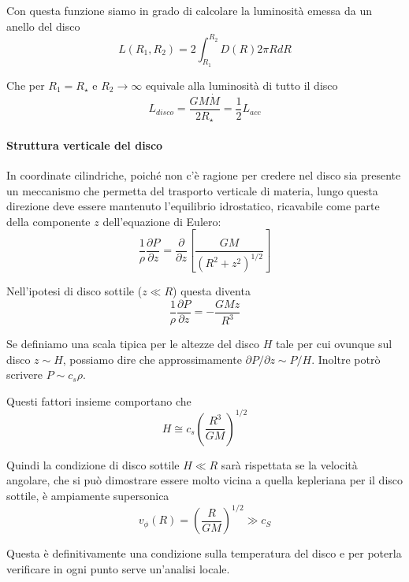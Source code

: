 \documentclass[a4paperbi]{article}
\begin{document}
	Con questa funzione siamo in grado di calcolare la luminosità emessa da un anello del disco
	\begin{equation}
		L(R_1,R_2)=2\int_{R_1}^{R_2}D(R)2\pi RdR
	\end{equation}
	
	Che per $R_1=R_{\star}$ e $R_2\to\infty$ equivale alla luminosità di tutto il disco
	\begin{equation}
		L_{disco}=\frac{GM\dot{M}}{2R_{\star}}=\frac{1}{2}L_{acc}
	\end{equation}
	
	\paragraph{Struttura verticale del disco}
	In coordinate cilindriche, poiché non c'è ragione per credere nel disco sia presente un meccanismo che permetta del trasporto verticale di materia, lungo questa direzione deve essere mantenuto l'equilibrio idrostatico, ricavabile come parte della componente $z$ dell'equazione di Eulero:
	\begin{equation*}
		\frac{1}{\rho}\frac{\partial P}{\partial z}=\frac{\partial}{\partial z}\left[\frac{GM}{(R^2+z^2)^{1/2}}\right]
	\end{equation*}
	
	Nell'ipotesi di disco sottile ($z\ll R$) questa diventa
	\begin{equation}
		\frac{1}{\rho}\frac{\partial P}{\partial z}=-\frac{GMz}{R^3}
	\end{equation}
	
	Se definiamo una scala tipica per le altezze del disco $H$ tale per cui ovunque sul disco $z\sim H$, possiamo dire che approssimamente $\partial P/\partial z\sim P/H$. Inoltre potrò scrivere $P\sim c_s\rho$.

	Questi fattori insieme comportano che
	\begin{equation}
		H\cong c_s\left(\frac{R^3}{GM}\right)^{1/2}
	\end{equation}

	Quindi la condizione di disco sottile $H\ll R$ sarà rispettata se la velocità angolare, che si può dimostrare essere molto vicina a quella kepleriana per il disco sottile, è ampiamente supersonica
	\begin{equation}
		v_\phi(R)=\left(\frac{R}{GM}\right)^{1/2}\gg c_S
	\end{equation}

	Questa è definitivamente una condizione sulla temperatura del disco e per poterla verificare in ogni punto serve un'analisi locale.
	
\end{document}
